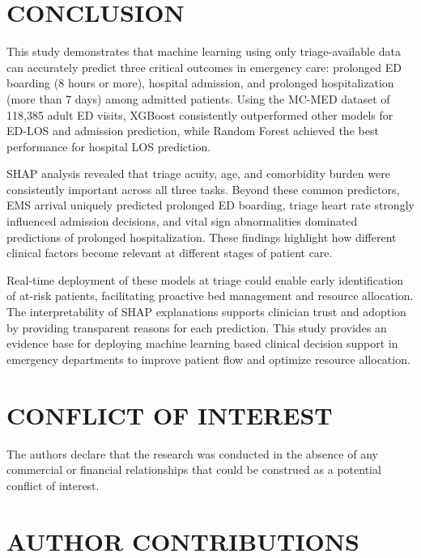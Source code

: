 \documentclass[harvard,article]{frontiersinFPHY_FAMS}
\begin{document}
\section{CONCLUSION}

This study demonstrates that machine learning using only triage-available data can accurately predict three critical outcomes in emergency care: prolonged ED boarding (8 hours or more), hospital admission, and prolonged hospitalization (more than 7 days) among admitted patients. Using the MC-MED dataset of 118,385 adult ED visits, XGBoost consistently outperformed other models for ED-LOS and admission prediction, while Random Forest achieved the best performance for hospital LOS prediction.

SHAP analysis revealed that triage acuity, age, and comorbidity burden were consistently important across all three tasks. Beyond these common predictors, EMS arrival uniquely predicted prolonged ED boarding, triage heart rate strongly influenced admission decisions, and vital sign abnormalities dominated predictions of prolonged hospitalization. These findings highlight how different clinical factors become relevant at different stages of patient care.

Real-time deployment of these models at triage could enable early identification of at-risk patients, facilitating proactive bed management and resource allocation. The interpretability of SHAP explanations supports clinician trust and adoption by providing transparent reasons for each prediction. This study provides an evidence base for deploying machine learning based clinical decision support in emergency departments to improve patient flow and optimize resource allocation.

\section{CONFLICT OF INTEREST}

The authors declare that the research was conducted in the absence of any commercial or financial relationships that could be construed as a potential conflict of interest.

\section{AUTHOR CONTRIBUTIONS}
\end{document}
